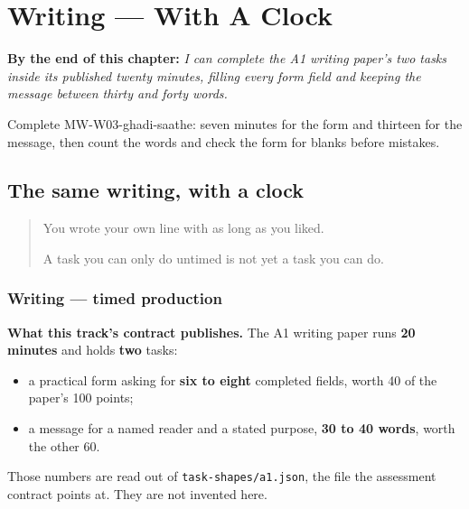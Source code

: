
\chapter{Writing --- With A Clock}
\label{ch:mw-ghadi-saathe}

\begin{chapteropening}
\textbf{By the end of this chapter:} \emph{I can complete the A1 writing paper's two tasks inside its published twenty minutes, filling every form field and keeping the message between thirty and forty words.}

Complete MW-W03-ghadi-saathe: seven minutes for the form and thirteen for the message, then count the words and check the form for blanks before mistakes.
\end{chapteropening}

\section[(with a clock)]{The same writing, with a clock}

\label{lesson:MW-W03-ghadi-saathe}



\begin{quote}
You wrote your own line with as long as you liked.

A task you can only do untimed is not yet a task you can do.
\end{quote}

\subsection*{Writing — timed production}
\textbf{What this track's contract publishes.} The A1 writing paper runs \textbf{20 minutes} and holds \textbf{two} tasks:

\begin{itemize}
\raggedright
  \item a practical form asking for \textbf{six to eight} completed fields, worth 40 of the paper's 100 points;
  \item a message for a named reader and a stated purpose, \textbf{30 to 40 words}, worth the other 60.
\end{itemize}

Those numbers are read out of \texttt{task-shapes/a1.json}, the file the assessment contract points at. They are not invented here.

